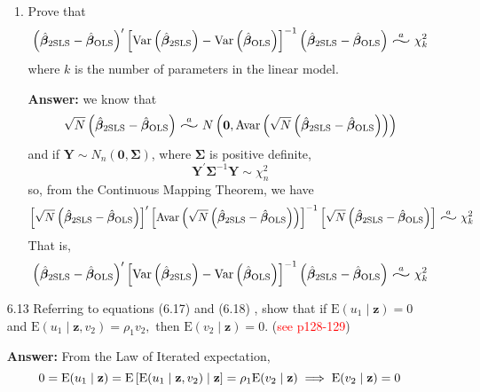 \begin{enumerate}
\begin{enumerate}
        \item Prove that
        \[ \left( \hat{\bm{\beta}}_{\mathrm{2SLS}} - \hat{\bm{\beta}}_{\mathrm{OLS}} \right)^\prime \left[ \var\left( \hat{\bm{\beta}}_{\mathrm{2SLS}} \right) - \var\left( \hat{\bm{\beta}}_{\mathrm{OLS}} \right) \right]^{-1} \left( \hat{\bm{\beta}}_{\mathrm{2SLS}} - \hat{\bm{\beta}}_{\mathrm{OLS}} \right) \stackrel{a}{\scalebox{2}[1]{$\sim$}} \chi^2_k \]
        where $k$ is the number of parameters in the linear model.
        
        \textbf{Answer:} we know that
        \[ \sqrt{N}\left( \hat{\bm{\beta}}_{\mathrm{2SLS}} - \hat{\bm{\beta}}_{\mathrm{OLS}} \right) \stackrel{a}{\scalebox{2}[1]{$\sim$}} N \left( \mathbf{0}, \avar\left( \sqrt{N}\left( \hat{\bm{\beta}}_{\mathrm{2SLS}} - \hat{\bm{\beta}}_{\mathrm{OLS}} \right) \right) \right) \]
        and if $\mathbf{Y} \sim N_n(\mathbf{0},\bm{\Sigma})$, where $\bm{\Sigma}$ is positive definite,
        \[ \mathbf{Y}^\prime \bm{\Sigma}^{-1}\mathbf{Y} \sim \chi^2_n \]
        so, from the Continuous Mapping Theorem, we have
        \[ \left[ \sqrt{N}\left( \hat{\bm{\beta}}_{\mathrm{2SLS}} - \hat{\bm{\beta}}_{\mathrm{OLS}} \right) \right]^\prime \left[ \avar\left( \sqrt{N}\left( \hat{\bm{\beta}}_{\mathrm{2SLS}} - \hat{\bm{\beta}}_{\mathrm{OLS}} \right) \right) \right]^{-1} \left[ \sqrt{N}\left( \hat{\bm{\beta}}_{\mathrm{2SLS}} - \hat{\bm{\beta}}_{\mathrm{OLS}} \right) \right] \stackrel{a}{\scalebox{2}[1]{$\sim$}} \chi^2_k \]
        That is,
        \[ \left( \hat{\bm{\beta}}_{\mathrm{2SLS}} - \hat{\bm{\beta}}_{\mathrm{OLS}} \right)^\prime \left[ \var\left( \hat{\bm{\beta}}_{\mathrm{2SLS}} \right) - \var\left( \hat{\bm{\beta}}_{\mathrm{OLS}} \right) \right]^{-1} \left( \hat{\bm{\beta}}_{\mathrm{2SLS}} - \hat{\bm{\beta}}_{\mathrm{OLS}} \right) \stackrel{a}{\scalebox{2}[1]{$\sim$}} \chi^2_k \]
    \end{enumerate}
    
    \item[6.13] Referring to equations (6.17) and (6.18) , show that if $\mathrm{E}\left(u_{1} \mid \mathbf{z}\right)=0$ and $\mathrm{E}\left(u_{1} \mid \mathbf{z}, v_{2}\right)=\rho_{1} v_{2},$ then $\mathrm{E}\left(v_{2} \mid \mathbf{z}\right)=0$. (\textcolor{red}{see p128-129})
    
    \textbf{Answer:} From the Law of Iterated expectation,
    \[ 0 = \mathrm{E}(u_1 \mid \mathbf{z}) = \mathrm{E}\left[ \mathrm{E}(u_1 \mid \mathbf{z},v_2)\mid \mathbf{z} \right] = \rho_1 \mathrm{E}(v_2 \mid \mathbf{z}) \implies \mathrm{E}(v_2 \mid \mathbf{z}) = 0 \]
\end{enumerate}